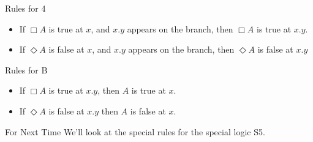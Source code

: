 \documentclass[
  ignorenonframetext,
]{beamer}
\providecommand{\tightlist}{%
  \setlength{\itemsep}{0pt}\setlength{\parskip}{0pt}}
\renewcommand{\,}{\text{, }}
\begin{document}
\begin{frame}{Rules for 4}
\protect\hypertarget{rules-for-4}{}
\begin{itemize}
\tightlist
\item
  If \(\Box A\) is true at \(x\), and \(x.y\) appears on the branch,
  then \(\Box A\) is true at \(x.y\).
\item
  If \(\Diamond A\) is false at \(x\), and \(x.y\) appears on the
  branch, then \(\Diamond A\) is false at \(x.y\)
\end{itemize}
\end{frame}

\begin{frame}{Rules for B}
\protect\hypertarget{rules-for-b}{}
\begin{itemize}
\tightlist
\item
  If \(\Box A\) is true at \(x.y\), then \(A\) is true at \(x\).
\item
  If \(\Diamond A\) is false at \(x.y\) then \(A\) is false at \(x\).
\end{itemize}
\end{frame}

\begin{frame}{For Next Time}
\protect\hypertarget{for-next-time}{}
We'll look at the special rules for the special logic S5.
\end{frame}
\end{document}
